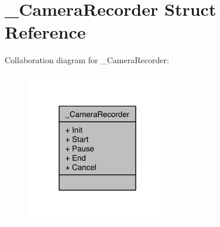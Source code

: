 \hypertarget{struct__CameraRecorder}{\section{\-\_\-\-Camera\-Recorder Struct Reference}
\label{struct__CameraRecorder}
}


Collaboration diagram for \-\_\-\-Camera\-Recorder\-:\nopagebreak
\begin{figure}[H]
\begin{center}
\leavevmode
\includegraphics[width=178pt]{da/dc3/struct__CameraRecorder__coll__graph}
\end{center}
\end{figure}

